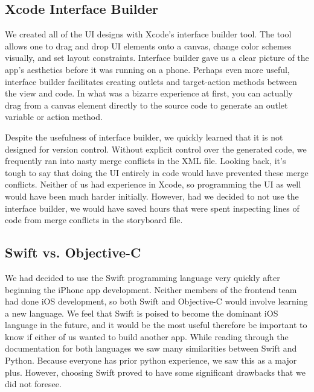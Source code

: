 \documentclass[12pt]{article}
\begin{document}
\subsection{Xcode Interface Builder}

We created all of the UI designs with Xcode's interface builder tool.
The tool allows one to drag and drop UI elements onto a canvas, change color schemes visually, and set layout constraints.
Interface builder gave us a clear picture of the app's aesthetics before it was running on a phone. 
Perhaps even more useful, interface builder facilitates creating outlets and target-action methods between the view and code. 
In what was a bizarre experience at first, you can actually drag from a canvas element directly to the source code to generate an outlet variable or action method. 

\bigskip

Despite the usefulness of interface builder, we quickly learned that it is not designed for version control.
Without explicit control over the generated code, we frequently ran into nasty merge conflicts in the XML file.
Looking back, it's tough to say that doing the UI entirely in code would have prevented these merge conflicts. 
Neither of us had experience in Xcode, so programming the UI as well would have been much harder initially. 
However, had we decided to not use the interface builder, we would have saved hours that were spent inspecting lines of code from merge conflicts in the storyboard file. 

\bigskip

\subsection{Swift vs. Objective-C}
We had decided to use the Swift programming language very quickly after beginning the iPhone app development.
Neither members of the frontend team had done iOS development, so both Swift and Objective-C would involve learning a new language. 
We feel that Swift is poised to become the dominant iOS language in the future, and it would be the most useful therefore be important to know if either of us wanted to build another app. 
While reading through the documentation for both languages we saw many similarities between Swift and Python. 
Because everyone has prior python experience, we saw this as a major plus. 
However, choosing Swift proved to have some significant drawbacks that we did not foresee. 

\bigskip
\end{document}
